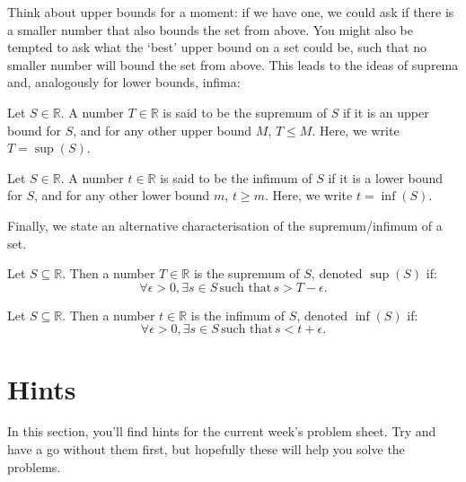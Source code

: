 \documentclass[
  12pt,
  a4paper]{extarticle}
\theoremstyle{plain}
\theoremstyle{definition}
\theoremstyle{plain}
\theoremstyle{plain}
\theoremstyle{plain}
\theoremstyle{plain}
\theoremstyle{definition}
\theoremstyle{definition}
\theoremstyle{remark}
\theoremstyle{remark}
\let\BeginKnitrBlock\begin \let\EndKnitrBlock\end
\renewcommand{\;}{\,}
\begin{document}
Think about upper bounds for a moment: if we have one, we could ask if there is a smaller number that also bounds the set from above. You might also be tempted to ask what the `best' upper bound on a set could be, such that no smaller number will bound the set from above. This leads to the ideas of suprema and, analogously for lower bounds, infima:

\BeginKnitrBlock{definition}[Supremum]
{\label{def:def9} }Let \(S \in \mathbb{R}\). A number \(T \in \mathbb{R}\) is said to be the supremum of \(S\) if it is an upper bound for \(S\), and for any other upper bound \(M\), \(T \leq M\). Here, we write \(T = \sup(S)\).
\EndKnitrBlock{definition}

\BeginKnitrBlock{definition}[Infimum]
{\label{def:def10} }Let \(S \in \mathbb{R}\). A number \(t \in \mathbb{R}\) is said to be the infimum of \(S\) if it is a lower bound for \(S\), and for any other lower bound \(m\), \(t\geq m\). Here, we write \(t = \inf(S)\).
\EndKnitrBlock{definition}

Finally, we state an alternative characterisation of the supremum/infimum of a set.
\BeginKnitrBlock{proposition}
{\label{prp:prop2} }Let \(S\subseteq\mathbb{R}\). Then a number \(T\in\mathbb{R}\) is the supremum of \(S\), denoted \(\sup(S)\) if: \[\forall \epsilon > 0, \exists s \in S\; \text{such that} \; s > T - \epsilon.\]
\EndKnitrBlock{proposition}

\BeginKnitrBlock{proposition}
{\label{prp:prop3} }Let \(S\subseteq\mathbb{R}\). Then a number \(t\in\mathbb{R}\) is the infimum of \(S\), denoted \(\inf(S)\) if: \[\forall \epsilon > 0, \exists s \in S\; \text{such that} \; s < t + \epsilon.\]
\EndKnitrBlock{proposition}

\hypertarget{hints}{%
\section{Hints}\label{hints}}

In this section, you'll find hints for the current week's problem sheet. Try and have a go without them first, but hopefully these will help you solve the problems.
\end{document}
